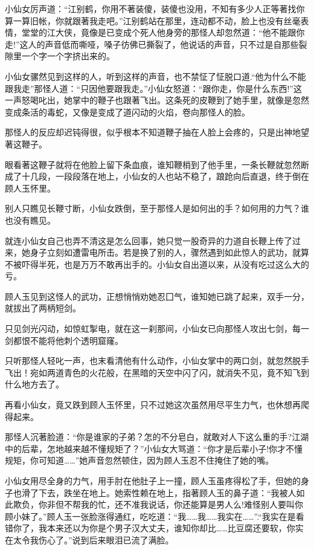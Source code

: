 \documentclass[12pt,oneside]{book}
\begin{document}
小仙女厉声道：``江别鹤，你用不著装傻，装傻也没用，不知有多少人正等著找你算一算旧帐，你就跟著我走吧。''江别鹤站在那里，连动都不动，脸上也没有丝毫表情，堂堂的江大侠，竟像是已变成个死人他身旁的那怪人却忽然道：``他不能跟你走!''这人的声音低而嘶哑，嗓子彷佛已撕裂了，他说话的声音，只不过是自那些裂隙里一个字一个字挤出来的。

小仙女骡然见到这样的人，听到这样的声音，也不禁怔了怔脱口道.``他为什么不能跟我走''那怪人道：``只因他要跟我走。''小仙女怒道：``跟你走，你是什么东西!''这一声怒喝叱出，她掌中的鞭子也跟著飞出。这条死的皮鞭到了她手里，就像是忽然变成条活的毒蛇，又像是变成了道闪动的火焰，卷向那怪人的脸。

那怪人的反应却迟钝得很，似乎根本不知道鞭子抽在人脸上会疼的，只是出神地望著这鞭子。

眼看著这鞭子就将在他脸上留下条血痕，谁知鞭梢到了他手里，一条长鞭就忽然断成了十几段，一段段落在地上，小仙女的人也站不稳了，踉跄向后直退，终于倒在顾人玉怀里。

别人只瞧见长鞭寸断，小仙女跌倒，至于那怪人是如何出的手？如何用的力气？谁也没有瞧见。

就连小仙女自己也弄不清这是怎么回事，她只觉一股奇异的力道自长鞭上传了过来，她身子立刻如遭雷电所击。若是换了别的人，骤然遇到如此惊人的武功，就算不被吓得半死，也是万万不敢再出手的。小仙女自出道以来，从没有吃过这么大的亏。

顾人玉见到这怪人的武功，正想悄悄劝她忍囗气，谁知她已跳了起来，双手一分，就拔出了两柄短剑。

只见剑光闪动，如惊虹掣电，就在这一刹那间，小仙女已向那怪人攻出七剑，每一剑都恨不能将他刺个透明窟窿。

只听那怪人轻叱一声，也末看清他有什么动作，小仙女掌中的两口剑，就忽然脱手飞出！宛如两道青色的火花般，在黑暗的天空中闪了闪，就消失不见，竟不知飞到什么地方去了。

再看小仙女，竟又跌到顾人玉怀里，只不过她这次虽然用尽平生力气，也休想再爬得起来。

那怪人沉著脸道：``你是谁家的子弟？怎的不分皂白，就敢对人下这么重的手?江湖中的后辈，怎地越来越不懂规矩了？''小仙女大骂道：``你才是后辈小子!你才不懂规矩，你可知道\ldots\ldots{}''她声音忽然顿住，因为顾人玉忍不住掩住了她的嘴。

小仙女用尽全身的力气，用手肘在他肚子上一撞，顾人玉虽疼得松了手，但她的身子也滑了下去，跌坐在地上。她索性赖在地上，指著顾人玉的鼻子道：``我被人如此欺负，你非但不帮我的忙，还不准我说话，你还能算是男人么!难怪别人要叫你顾小妹了。''顾人玉一张脸涨得通红，吃吃道：``我\ldots\ldots 我\ldots\ldots 我实在\ldots\ldots{}''.``我实在是看错你了，我本来还以为你是个男子汉大丈夫，谁知你却比\ldots\ldots 比豆腐还要软，你实在太令我伤心了。''说到后来眼泪已流了满脸。
\end{document}
